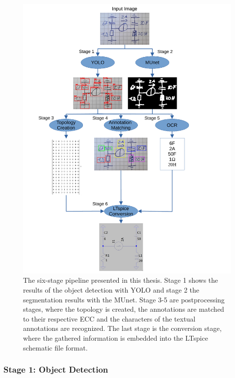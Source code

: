 \begin{figure}
\begin{center}
    \includegraphics[width=15cm]{imgs/pipeline/pipeline_overview.pdf}
    \caption{The six-stage pipeline presented in this thesis. Stage 1 shows the results of the object detection with \ac{YOLO} and stage 2 the segmentation results with the \ac{MUnet}. Stage 3-5 are postprocessing stages, where the topology is created, the annotations are matched to their respective \ac{ECC} and the characters of the textual annotations are recognized. The last stage is the conversion stage, where the gathered information is embedded into the LTspice schematic file format.}
    \label{fig:pipeline}
\end{center}
\end{figure}


\subsubsection{Stage 1: Object Detection}

